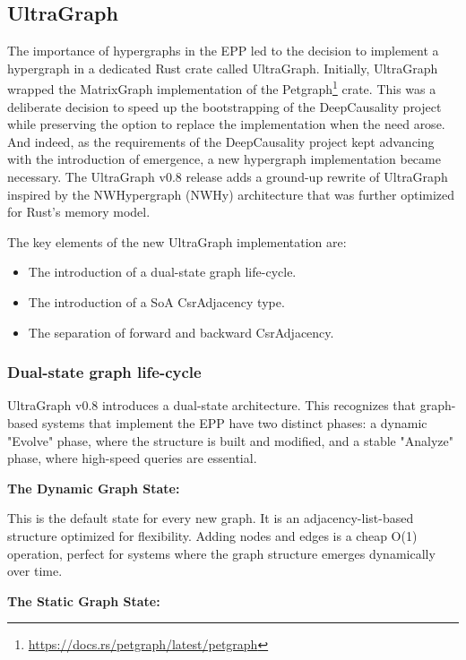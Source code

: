 \subsection{UltraGraph}
\label{sec:implementation_ultragraph}

The importance of hypergraphs in the EPP led to the decision to implement a hypergraph in a dedicated Rust crate called UltraGraph. Initially, UltraGraph wrapped the MatrixGraph implementation of the 
Petgraph\footnote{\url{https://docs.rs/petgraph/latest/petgraph}} crate. This was a deliberate decision
to speed up the bootstrapping of the DeepCausality project while preserving the option to 
replace the implementation when the need arose. And indeed, as the requirements  of the
DeepCausality project kept advancing with the introduction of emergence, a new hypergraph implementation became necessary. The UltraGraph v0.8 release adds a ground-up rewrite of  UltraGraph inspired by the NWHypergraph (NWHy)\cite{liu2022nwhy} architecture that was further optimized for Rust's memory model. 
  
The key elements of the new UltraGraph implementation are:
  
\begin{itemize}
	\item The introduction of a dual-state graph life-cycle.
	\item The introduction of a SoA CsrAdjacency type.
	\item The separation of forward and backward CsrAdjacency.
\end{itemize}

\subsubsection{Dual-state graph life-cycle}


UltraGraph v0.8 introduces a dual-state architecture. This recognizes that graph-based systems that implement the EPP have two distinct phases: a dynamic "Evolve" phase, where the structure is built and modified, and a stable "Analyze" phase, where high-speed queries are essential. 

\textbf{The Dynamic Graph State:} 

This is the default state for every new graph. It is an adjacency-list-based structure
optimized for flexibility. Adding nodes and edges is a cheap O(1) operation, perfect for systems where the graph structure emerges dynamically over time.

\textbf{The Static Graph State:}

